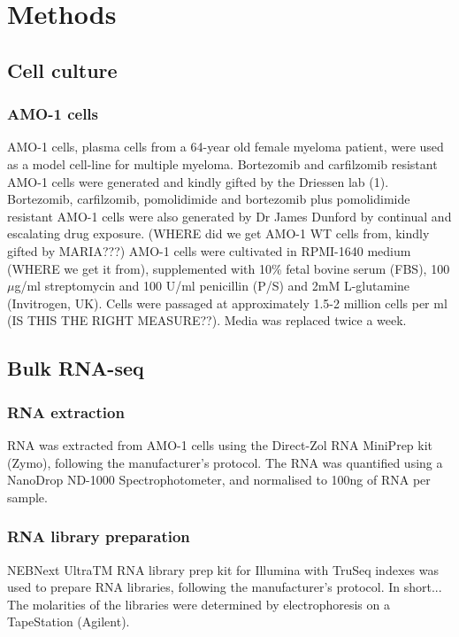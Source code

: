 \chapter{\label{ch:3-methods}Methods}


\section{Cell culture}
\subsection{AMO-1 cells}
AMO-1 cells, plasma cells from a 64-year old female myeloma patient, were used as a model cell-line for multiple myeloma. Bortezomib and carfilzomib resistant AMO-1 cells were generated and kindly gifted by the Driessen lab (1). Bortezomib, carfilzomib, pomolidimide and bortezomib plus pomolidimide resistant AMO-1 cells were also generated by Dr James Dunford by continual and escalating drug exposure. (WHERE did we get AMO-1 WT cells from, kindly gifted by MARIA???)
AMO-1 cells were cultivated in RPMI-1640 medium (WHERE we get it from), supplemented with 10\% fetal bovine serum (FBS), 100$\mu$g/ml streptomycin and 100 U/ml penicillin (P/S) and 2mM L-glutamine (Invitrogen, UK). Cells were passaged at approximately 1.5-2 million cells per ml (IS THIS THE RIGHT MEASURE??). Media was replaced twice a week.


\section{Bulk RNA-seq}
\subsection{RNA extraction}
RNA was extracted from AMO-1 cells using the Direct-Zol RNA MiniPrep kit (Zymo), following the manufacturer's protocol.  The RNA was quantified using a NanoDrop ND-1000 Spectrophotometer, and normalised to 100ng of RNA per sample.


\subsection{RNA library preparation}
NEBNext\textsuperscript{\textregistered} UltraTM RNA library prep kit for Illumina\textsuperscript{\textregistered} with TruSeq indexes was used to prepare RNA libraries, following the manufacturer's protocol. In short...
The molarities of the libraries were determined by electrophoresis on a TapeStation (Agilent).

